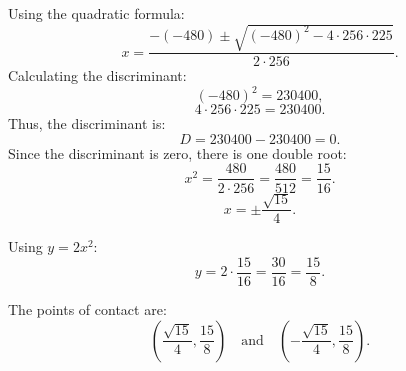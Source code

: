 \documentclass[12pt]{article}
\begin{document}
\begin{enumerate}[start=1,label={\bfseries. },leftmargin=1in]
 
    Using the quadratic formula:
    \[
    x = \frac{-(-480) \pm \sqrt{(-480)^2 - 4 \cdot 256 \cdot 225}}{2 \cdot 256}.
    \]
    Calculating the discriminant:
    \[
    (-480)^2 = 230400,
    \]
    \[
    4 \cdot 256 \cdot 225 = 230400.
    \]
    Thus, the discriminant is:
    \[
    D = 230400 - 230400 = 0.
    \]
    Since the discriminant is zero, there is one double root:
    \[
    x^2 = \frac{480}{2 \cdot 256} = \frac{480}{512} = \frac{15}{16}.
    \]
    \[
    x = \pm \frac{\sqrt{15}}{4}.
    \]

    Using \( y = 2x^2 \):
    \[
    y = 2 \cdot \frac{15}{16} = \frac{30}{16} = \frac{15}{8}.
    \]

    The points of contact are:
    \[
    \left(\frac{\sqrt{15}}{4}, \frac{15}{8}\right) \quad \text{and} \quad \left(-\frac{\sqrt{15}}{4}, \frac{15}{8}\right).
    \]
\end{enumerate}
\end{document}

